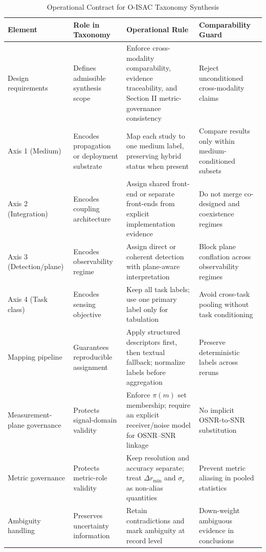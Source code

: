 \documentclass[lettersize,journal]{IEEEtran}
\begin{document}
\begin{table}[!t]
\caption{Operational Contract for O-ISAC Taxonomy Synthesis}
\label{tab:taxonomy_contract}
\centering
\footnotesize
\begin{tabularx}{\textwidth}{@{}>{\raggedright\arraybackslash}p{2.15cm} >{\raggedright\arraybackslash}X >{\raggedright\arraybackslash}X >{\raggedright\arraybackslash}X@{}}
\toprule
\textbf{Element} &
\textbf{Role in Taxonomy} &
\textbf{Operational Rule} &
\textbf{Comparability Guard} \\
\midrule

Design requirements &
Defines admissible synthesis scope &
Enforce cross-modality comparability, evidence traceability, and Section II metric-governance consistency &
Reject unconditioned cross-modality claims \\

Axis 1 (Medium) &
Encodes propagation or deployment substrate &
Map each study to one medium label, preserving hybrid status when present &
Compare results only within medium-conditioned subsets \\

Axis 2 (Integration) &
Encodes coupling architecture &
Assign shared front-end or separate front-ends from explicit implementation evidence &
Do not merge co-designed and coexistence regimes \\

Axis 3 (Detection/plane) &
Encodes observability regime &
Assign direct or coherent detection with plane-aware interpretation &
Block plane conflation across observability regimes \\

Axis 4 (Task class) &
Encodes sensing objective &
Keep all task labels; use one primary label only for tabulation &
Avoid cross-task pooling without task conditioning \\

Mapping pipeline &
Guarantees reproducible assignment &
Apply structured descriptors first, then textual fallback; normalize labels before aggregation &
Preserve deterministic labels across reruns \\

Measurement-plane governance &
Protects signal-domain validity &
Enforce $\pi(m)$ set membership; require an explicit receiver/noise model for OSNR--SNR linkage &
No implicit OSNR-to-SNR substitution \\

Metric governance &
Protects metric-role validity &
Keep resolution and accuracy separate; treat $\Delta r_{\min}$ and $\sigma_r$ as non-alias quantities &
Prevent metric aliasing in pooled statistics \\

Ambiguity handling &
Preserves uncertainty information &
Retain contradictions and mark ambiguity at record level &
Down-weight ambiguous evidence in conclusions \\
\bottomrule
\end{tabularx}
\end{table}
\end{document}
